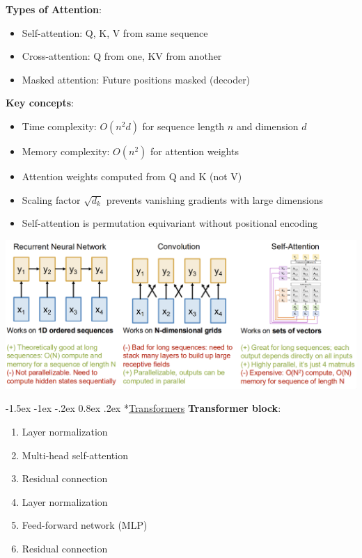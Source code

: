 \documentclass{article}
\makeatletter
\renewcommand\section{\@startsection{section}{1}{\z@}%
                                  {-1.5ex \@plus -1ex \@minus -.2ex}%
                                  {0.8ex \@plus.2ex}%
                                  {\normalfont\small\bfseries}}
\makeatother
\begin{document}
\begin{multicols}{3}
\textbf{Types of Attention}:
\begin{itemize}
\item Self-attention: Q, K, V from same sequence
\item Cross-attention: Q from one, KV from another
\item Masked attention: Future positions masked (decoder)
\end{itemize}

\textbf{Key concepts}:
\begin{itemize}
\item Time complexity: $O(n^2d)$ for sequence length $n$ and dimension $d$
\item Memory complexity: $O(n^2)$ for attention weights
\item Attention weights computed from Q and K (not V)
\item Scaling factor $\sqrt{d_k}$ prevents vanishing gradients with large dimensions
\item Self-attention is permutation equivariant without positional encoding
\end{itemize}

\includegraphics[width=\columnwidth]{imgs/seqs.png}

\section*{\underline{Transformers}}
\textbf{Transformer block}:
\begin{enumerate}
\item Layer normalization
\item Multi-head self-attention
\item Residual connection
\item Layer normalization
\item Feed-forward network (MLP)
\item Residual connection
\end{enumerate}


\end{multicols}
\end{document}
